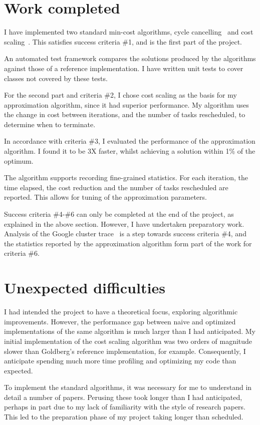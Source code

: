 \section{Work completed}

I have implemented two standard min-cost algorithms, cycle cancelling~\cite{Klein:1967} and cost scaling~\cite{Goldberg:1987}. This satisfies success criteria \#1, and is the first part of the project.

An automated test framework compares the solutions produced by the algorithms against those of a reference implementation. I have written unit tests to cover classes not covered by these tests.

For the second part and criteria \#2, I chose cost scaling as the basis for my approximation algorithm, since it had superior performance. My algorithm uses the change in cost between iterations, and the number of tasks rescheduled, to determine when to terminate.

In accordance with criteria \#3, I evaluated the performance of the approximation algorithm. I found it to be 3X faster, whilst achieving a solution within 1\% of the optimum. 

The algorithm supports recording fine-grained statistics. For each iteration, the time elapsed, the cost reduction and the number of tasks rescheduled are reported. This allows for tuning of the approximation parameters.

Success criteria \#4-\#6 can only be completed at the end of the project, as explained in the above section. However, I have undertaken preparatory work. Analysis of the Google cluster trace~\cite{clusterdata:Wilkes2011} is a step towards success criteria \#4, and the statistics reported by the approximation algorithm form part of the work for criteria \#6.

\section{Unexpected difficulties}

I had intended the project to have a theoretical focus, exploring algorithmic improvements. However, the performance gap between naive and optimized implementations of the same algorithm is much larger than I had anticipated. My initial implementation of the cost scaling algorithm was two orders of magnitude slower than Goldberg's reference implementation, for example. Consequently, I anticipate spending much more time profiling and optimizing my code than expected.

To implement the standard algorithms, it was necessary for me to understand in detail a number of papers. Perusing these took longer than I had anticipated, perhaps in part due to my lack of familiarity with the style of research papers. This led to the preparation phase of my project taking longer than scheduled.
